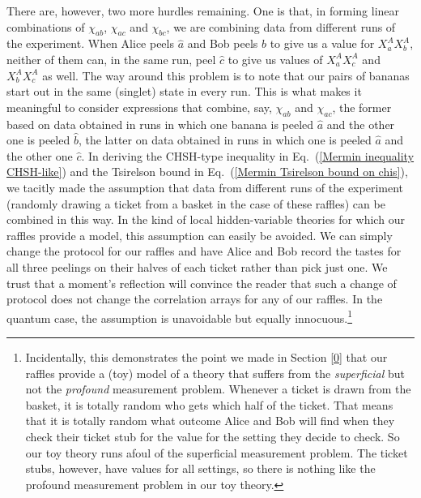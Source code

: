 There are, however, two more hurdles remaining. One is that, in forming linear combinations of $\chi_{ab}$, $\chi_{ac}$ and $\chi_{bc}$, we are combining data from different runs of the experiment.  When Alice peels $\hat{a}$ and Bob peels $\hat{b}$ to give us a value for $X^A_a X^A_b$, neither of them can, in the same run, peel $\hat{c}$ to give us values of $X^A_a X^A_c$ and $X^A_b X^A_c$ as well. The way around this problem is to note that our pairs of bananas start out in the same (singlet) state in every run. This is what makes it meaningful to consider expressions that combine, say, $\chi_{ab}$ and $\chi_{ac}$, the former based on data obtained in runs in which one banana is peeled $\hat{a}$ and the other one is peeled $\hat{b}$, the latter on data obtained in runs in which one is peeled $\hat{a}$ and the other one $\hat{c}$. In deriving the CHSH-type inequality in Eq.\ (\ref{Mermin inequality CHSH-like}) and the Tsirelson bound in Eq.\ (\ref{Mermin Tsirelson bound on chis}), we tacitly made the assumption that data from different runs of the experiment (randomly drawing a ticket from a basket in the case of these raffles) can be combined in this way. In the kind of local hidden-variable theories for which our raffles provide a model, this assumption can easily be avoided. We can simply change the protocol for our raffles and have Alice and Bob record the tastes for all three peelings on their halves of each ticket rather than pick just one. We trust that a moment's reflection will convince the reader that such a change of protocol does not change the correlation arrays for any of our raffles. In the quantum case, the assumption is unavoidable but equally innocuous.\footnote{Incidentally, this demonstrates the point we made in Section \ref{0} that our raffles provide a (toy) model of a theory that suffers from the \emph{superficial} but not the \emph{profound} measurement problem. Whenever a ticket is drawn from the basket, it is totally random who gets which half of the ticket. That means that it is totally random what outcome Alice and Bob will find when they check their ticket stub for the value for the setting they decide to check. So our toy theory runs afoul of the superficial measurement problem. The ticket stubs, however, have values for all settings, so there is nothing like the profound measurement problem in our toy theory.\label{minor/major}}

